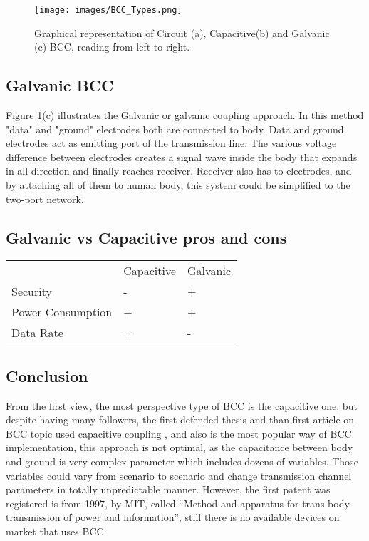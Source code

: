 \begin{figure}[!h]
    \centering
    \texttt{[image: images/BCC\_Types.png]}
    \caption{Graphical representation of Circuit (a), Capacitive(b) and Galvanic (c) BCC, reading from left to right. \cite{imp_of_bcc}}
    \label{fig:bcc_types}
\end{figure}

\subsection{Galvanic BCC}
\quad Figure \ref{fig:bcc_types}(c) illustrates the Galvanic or galvanic coupling approach. In this method "data" and "ground" electrodes both are connected to body. Data and ground electrodes act as emitting port of the transmission line. The various voltage difference between electrodes creates a signal wave inside the body that expands in all direction and finally reaches receiver. Receiver also has to electrodes, and by attaching all of them to human body, this system could be simplified to the two-port network.

\subsection{Galvanic vs Capacitive pros and cons}
    \begin{table}[!h]
        \begin{tabular}{lll}
                              & Capacitive & Galvanic     \\
            Security          & -          & +            \\
            Power Consumption & +          & +            \\
            Data Rate         & +          & -           
        \end{tabular}
    \end{table}

\subsection{Conclusion}

\quad From the first view, the most perspective type of BCC is the capacitive one, but despite having many followers, the first defended thesis and than first article on BCC topic used capacitive coupling \cite{bcc_first_thesis}, \cite{bcc_first_article} and also is the most popular way of BCC implementation, this approach is not optimal, as the capacitance between body and ground is very complex parameter which includes dozens of variables. Those variables could vary from scenario to scenario and change transmission channel parameters in totally unpredictable manner. However, the first patent was registered is from 1997, by MIT, called “Method and apparatus for trans body transmission of power and information”, still there is no available devices on market that uses BCC. 



